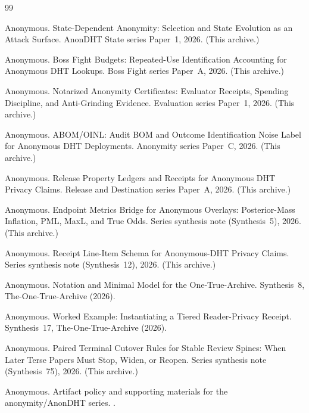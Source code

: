 \documentclass[11pt]{article}
\theoremstyle{definition}
\theoremstyle{remark}
\begin{document}
\begin{thebibliography}{99}

Anonymous.
\newblock State-Dependent Anonymity: Selection and State Evolution as an Attack Surface.
\newblock AnonDHT State series Paper~1, 2026. (This archive.)

Anonymous.
\newblock Boss Fight Budgets: Repeated-Use Identification Accounting for Anonymous DHT Lookups.
\newblock Boss Fight series Paper~A, 2026. (This archive.)

Anonymous.
\newblock Notarized Anonymity Certificates: Evaluator Receipts, Spending Discipline, and Anti-Grinding Evidence.
\newblock Evaluation series Paper~1, 2026. (This archive.)

Anonymous.
\newblock ABOM/OINL: Audit BOM and Outcome Identification Noise Label for Anonymous DHT Deployments.
\newblock Anonymity series Paper~C, 2026. (This archive.)

Anonymous.
\newblock Release Property Ledgers and Receipts for Anonymous DHT Privacy Claims.
\newblock Release and Destination series Paper~A, 2026. (This archive.)

Anonymous.
\newblock Endpoint Metrics Bridge for Anonymous Overlays: Posterior-Mass Inflation, PML, MaxL, and True Odds.
\newblock Series synthesis note (Synthesis~5), 2026. (This archive.)

Anonymous.
\newblock Receipt Line-Item Schema for Anonymous-DHT Privacy Claims.
\newblock Series synthesis note (Synthesis~12), 2026. (This archive.)

Anonymous.
\newblock Notation and Minimal Model for the One-True-Archive.
\newblock Synthesis~8, The-One-True-Archive (2026).

Anonymous.
\newblock Worked Example: Instantiating a Tiered Reader-Privacy Receipt.
\newblock Synthesis~17, The-One-True-Archive (2026).

Anonymous.
\newblock Paired Terminal Cutover Rules for Stable Review Spines: When Later Terse Papers Must Stop, Widen, or Reopen.
\newblock Series synthesis note (Synthesis~75), 2026. (This archive.)

Anonymous.
\newblock Artifact policy and supporting materials for the anonymity/AnonDHT series.
.



\end{thebibliography}
\end{document}

